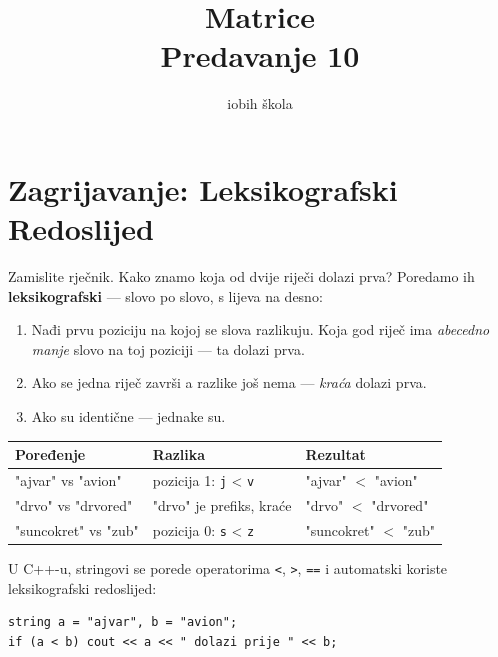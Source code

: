 \documentclass[11pt]{article}
\title{\textbf{Matrice}\\[4pt]\large Predavanje 10}
\author{iobih škola}
\date{}
\begin{document}
\maketitle
\thispagestyle{fancy}

\section*{Zagrijavanje: Leksikografski Redoslijed}

Zamislite rječnik. Kako znamo koja od dvije riječi dolazi prva? Poredamo
ih \textbf{leksikografski} — slovo po slovo, s lijeva na desno:

\begin{enumerate}
    \item Nađi prvu poziciju na kojoj se slova razlikuju.
          Koja god riječ ima \emph{abecedno manje} slovo na toj poziciji — ta dolazi prva.
    \item Ako se jedna riječ završi a razlike još nema — \emph{kraća} dolazi prva.
    \item Ako su identične — jednake su.
\end{enumerate}

\begin{center}
\begin{tabular}{@{} >{\ttfamily}l l l @{}}
    \toprule
    \textbf{Poređenje} & \textbf{Razlika} & \textbf{Rezultat} \\
    \midrule
    "ajvar" vs "avion"  & pozicija 1: \texttt{j} < \texttt{v} & "ajvar" $<$ "avion" \\
    "drvo"  vs "drvored" & "drvo" je prefiks, kraće & "drvo" $<$ "drvored" \\
    "suncokret" vs "zub" & pozicija 0: \texttt{s} < \texttt{z} & "suncokret" $<$ "zub" \\
    \bottomrule
\end{tabular}
\end{center}

\smallskip
U C++-u, stringovi se porede operatorima \texttt{<}, \texttt{>}, \texttt{==}
i automatski koriste leksikografski redoslijed:

\begin{lstlisting}
string a = "ajvar", b = "avion";
if (a < b) cout << a << " dolazi prije " << b;
\end{lstlisting}

\end{document}
